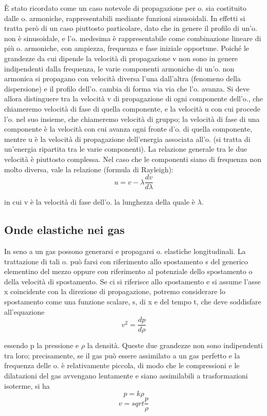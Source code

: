 \documentclass[a4paper]{article}
\begin{document}
È stato ricordato come un caso notevole di propagazione per o. sia costituito dalle o. armoniche, rappresentabili mediante funzioni sinusoidali. In effetti si tratta però di un caso piuttosto particolare, dato che in genere il profilo di un'o. non è sinusoidale, e l'o. medesima è rappresentabile come combinazione lineare di più o. armoniche, con ampiezza, frequenza e fase iniziale opportune. Poiché le grandezze da cui dipende la velocità di propagazione v non sono in genere indipendenti dalla frequenza, le varie componenti armoniche di un'o. non armonica si propagano con velocità diversa l'una dall'altra (fenomeno della dispersione) e il profilo dell'o. cambia di forma via via che l'o. avanza. Si deve allora distinguere tra la velocità v di propagazione di ogni componente dell'o., che chiameremo velocità di fase di quella componente, e la velocità u con cui procede l'o. nel suo insieme, che chiameremo velocità di gruppo; la velocità di fase di una componente è la velocità con cui avanza ogni fronte d'o. di quella componente, mentre u è la velocità di propagazione dell'energia associata all'o. (si tratta di un'energia ripartita tra le varie componenti). La relazione generale tra le due velocità è piuttosto complessa. Nel caso che le componenti siano di frequenza non molto diversa, vale la relazione (formula di Rayleigh): 
\begin{equation}
u=v-\lambda \frac{dv}{d\lambda}
\end{equation}

in cui v è la velocità di fase dell'o. la lunghezza della quale è $\lambda$. 

\subsection{Onde elastiche nei gas}
In seno a un gas possono generarsi e propagarsi o. elastiche longitudinali. La trattazione di tali o. può farsi con riferimento allo spostamento s del generico elementino del mezzo oppure con riferimento al potenziale dello spostamento o della velocità di spostamento. Se ci si riferisce allo spostamento e si assume l'asse x coincidente con la direzione di propagazione, potremo considerare lo spostamento come una funzione scalare, s, di x e del tempo t, che deve soddisfare all'equazione 
\begin{equation}
v^2=\frac{dp}{d\rho}
\end{equation}

essendo p la pressione e $\rho$ la densità. Queste due grandezze non sono indipendenti tra loro; precisamente, se il gas può essere assimilato a un gas perfetto e la frequenza delle o. è relativamente piccola, di modo che le compressioni e le dilatazioni del gas avvengano lentamente e siano assimilabili a trasformazioni isoterme, si ha 
\begin{equation}
p=k\rho
\end{equation}
\begin{equation}
v=sqrt{\frac{p}{\rho}}
\end{equation}
\end{document}
